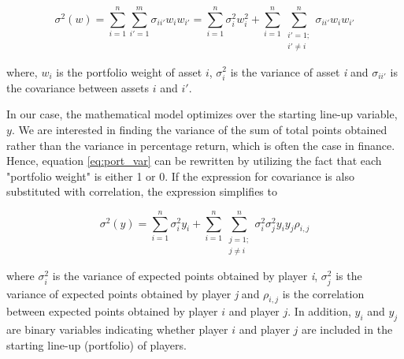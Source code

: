 \begin{equation}
    \sigma^2(w) = \sum_{i = 1}^{n}\sum_{i' = 1}^{m}\sigma_{ii'}w_{i}w_{i'} = \sum_{i = 1}^{n}\sigma_{i}^2w_i^2 + \sum_{i = 1}^{n}\sum_{\substack{i' = 1;\\ i' \neq i}}^{n}\sigma_{ii'}w_iw_{i'}
    \label{eq:port_var}
\end{equation}

where, $w_i$ is the portfolio weight of asset $i$, $\sigma_{i}^2$ is the variance of asset \textit{i} and $\sigma_{ii'}$ is the covariance between assets $i$ and $i'$. 

\newpar

In our case, the mathematical model optimizes over the starting line-up variable, $y$. We are interested in finding the variance of the sum of total points obtained rather than the variance in percentage return, which is often the case in finance. Hence,  equation \ref{eq:port_var} can be rewritten by utilizing the fact that each "portfolio weight" is either 1 or 0. If the expression for covariance is also substituted with correlation, the expression simplifies to

\begin{equation}
    \sigma^2(y) = \sum_{i = 1}^{n}\sigma_i^2y_i + \sum_{i = 1}^{n}\sum_{\substack{j = 1;\\ j \neq i}}^{n} \sigma_i^{2}\sigma_j^{2}y_{i}y_{j}\rho_{i,j}
    \label{eq:team_var}
\end{equation}

where $\sigma_{i}^2$ is the variance of expected points obtained by player \textit{i}, $\sigma_{j}^2$ is the variance of expected points obtained by player \textit{j} and $\rho_{i,j}$ is the correlation between expected points obtained by player $i$ and player $j$. In addition, $y_i$ and $y_j$ are binary variables indicating whether player $i$ and player $j$ are included in the starting line-up
(portfolio) of players.\newline

